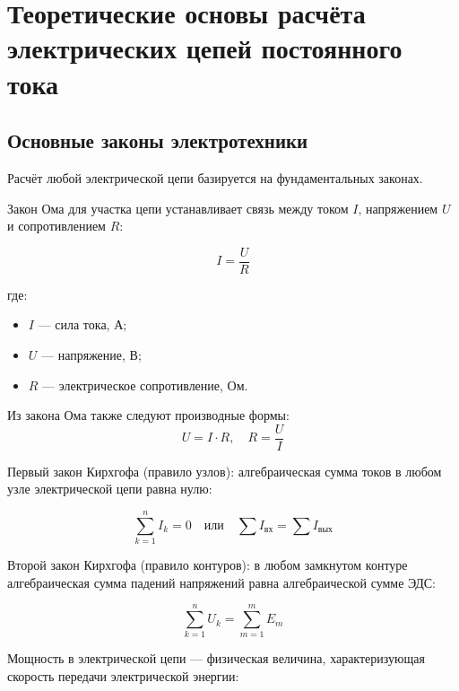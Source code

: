 \section{Теоретические основы расчёта электрических цепей постоянного тока}

\subsection{Основные законы электротехники}

Расчёт любой электрической цепи базируется на фундаментальных законах.

Закон Ома для участка цепи устанавливает связь между током \(I\), напряжением \(U\) и сопротивлением \(R\):

\begin{equation}
I = \frac{U}{R} \label{eq:ohm}
\end{equation}

где:
\begin{itemize}
    \item \(I\) --- сила тока, А;
    \item \(U\) --- напряжение, В;
    \item \(R\) --- электрическое сопротивление, Ом.
\end{itemize}

Из закона Ома также следуют производные формы:
\begin{equation}
U = I \cdot R, \quad R = \frac{U}{I} \label{eq:ohm2}
\end{equation}

Первый закон Кирхгофа (правило узлов): алгебраическая сумма токов в любом узле электрической цепи равна нулю:

\begin{equation}
\sum_{k=1}^{n} I_k = 0 \quad \text{или} \quad \sum I_{\text{вх}} = \sum I_{\text{вых}} \label{eq:kirchhoff1}
\end{equation}

Второй закон Кирхгофа (правило контуров): в любом замкнутом контуре алгебраическая сумма падений напряжений равна алгебраической сумме ЭДС\cite {femto_kirchhoff}:

\begin{equation}
\sum_{k=1}^{n} U_k = \sum_{m=1}^{m} E_m \label{eq:kirchhoff2}
\end{equation}

Мощность в электрической цепи --- физическая величина, характеризующая скорость передачи электрической энергии\cite {bessonov_toe}:

